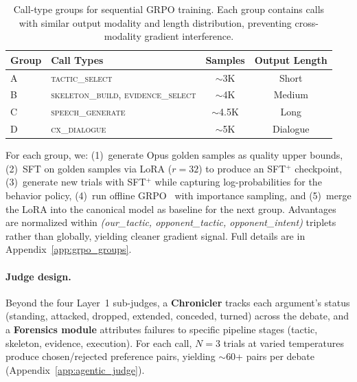 \begin{table}[t]
\centering
\small
\begin{tabular}{llcc}
\toprule
\textbf{Group} & \textbf{Call Types} & \textbf{Samples} & \textbf{Output Length} \\
\midrule
A & \textsc{tactic\_select} & $\sim$3K & Short \\
B & \textsc{skeleton\_build}, \textsc{evidence\_select} & $\sim$4K & Medium \\
C & \textsc{speech\_generate} & $\sim$4.5K & Long \\
D & \textsc{cx\_dialogue} & $\sim$5K & Dialogue \\
\bottomrule
\end{tabular}
\caption{Call-type groups for sequential GRPO training. Each group contains
calls with similar output modality and length distribution, preventing
cross-modality gradient interference.}
\label{tab:call_types}
\end{table}

For each group, we: (1)~generate Opus golden samples as quality upper
bounds, (2)~SFT on golden samples via LoRA ($r = 32$) to produce an SFT$^+$
checkpoint, (3)~generate new trials with SFT$^+$ while capturing
log-probabilities for the behavior policy, (4)~run offline
GRPO~\cite{shao2024deepseekmath} with importance sampling, and (5)~merge
the LoRA into the canonical model as baseline for the next group.
Advantages are normalized within \emph{(our\_tactic, opponent\_tactic,
opponent\_intent)} triplets rather than globally, yielding cleaner gradient
signal. Full details are in Appendix~\ref{app:grpo_groups}.

\paragraph{Judge design.}
Beyond the four Layer~1 sub-judges, a \textbf{Chronicler} tracks each
argument's status (standing, attacked, dropped, extended, conceded, turned)
across the debate, and a \textbf{Forensics module} attributes failures to
specific pipeline stages (tactic, skeleton, evidence, execution). For each
call, $N = 3$ trials at varied temperatures produce chosen/rejected
preference pairs, yielding $\sim$60+ pairs per debate
(Appendix~\ref{app:agentic_judge}).
